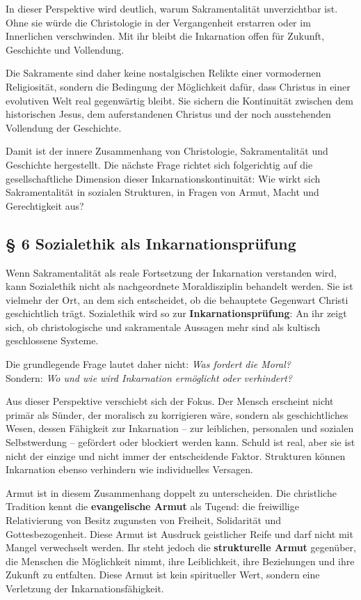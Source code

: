 \documentclass[
]{article}
\begin{document}
In dieser Perspektive wird deutlich, warum Sakramentalität unverzichtbar ist. Ohne sie würde die Christologie in der Vergangenheit erstarren oder im Innerlichen verschwinden. Mit ihr bleibt die Inkarnation offen für Zukunft, Geschichte und Vollendung.

Die Sakramente sind daher keine nostalgischen Relikte einer vormodernen Religiosität, sondern die Bedingung der Möglichkeit dafür, dass Christus in einer evolutiven Welt real gegenwärtig bleibt. Sie sichern die Kontinuität zwischen dem historischen Jesus, dem auferstandenen Christus und der noch ausstehenden Vollendung der Geschichte.

Damit ist der innere Zusammenhang von Christologie, Sakramentalität und Geschichte hergestellt. Die nächste Frage richtet sich folgerichtig auf die gesellschaftliche Dimension dieser Inkarnationskontinuität: Wie wirkt sich Sakramentalität in sozialen Strukturen, in Fragen von Armut, Macht und Gerechtigkeit aus?

\subsection{\texorpdfstring{\textbf{§ 6 Sozialethik als Inkarnationsprüfung}}{§ 6 Sozialethik als Inkarnationsprüfung}}\label{sozialethik-als-inkarnationspruxfcfung}

Wenn Sakramentalität als reale Fortsetzung der Inkarnation verstanden wird, kann Sozialethik nicht als nachgeordnete Moraldisziplin behandelt werden. Sie ist vielmehr der Ort, an dem sich entscheidet, ob die behauptete Gegenwart Christi geschichtlich trägt. Sozialethik wird so zur \textbf{Inkarnationsprüfung}: An ihr zeigt sich, ob christologische und sakramentale Aussagen mehr sind als kultisch geschlossene Systeme.

Die grundlegende Frage lautet daher nicht: \emph{Was fordert die Moral?\\
}Sondern: \emph{Wo und wie wird Inkarnation ermöglicht oder verhindert?}

Aus dieser Perspektive verschiebt sich der Fokus. Der Mensch erscheint nicht primär als Sünder, der moralisch zu korrigieren wäre, sondern als geschichtliches Wesen, dessen Fähigkeit zur Inkarnation -- zur leiblichen, personalen und sozialen Selbstwerdung -- gefördert oder blockiert werden kann. Schuld ist real, aber sie ist nicht der einzige und nicht immer der entscheidende Faktor. Strukturen können Inkarnation ebenso verhindern wie individuelles Versagen.

Armut ist in diesem Zusammenhang doppelt zu unterscheiden. Die christliche Tradition kennt die \textbf{evangelische Armut} als Tugend: die freiwillige Relativierung von Besitz zugunsten von Freiheit, Solidarität und Gottesbezogenheit. Diese Armut ist Ausdruck geistlicher Reife und darf nicht mit Mangel verwechselt werden. Ihr steht jedoch die \textbf{strukturelle Armut} gegenüber, die Menschen die Möglichkeit nimmt, ihre Leiblichkeit, ihre Beziehungen und ihre Zukunft zu entfalten. Diese Armut ist kein spiritueller Wert, sondern eine Verletzung der Inkarnationsfähigkeit.
\end{document}

